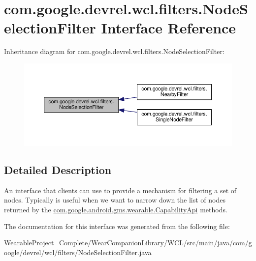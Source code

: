 \hypertarget{interfacecom_1_1google_1_1devrel_1_1wcl_1_1filters_1_1NodeSelectionFilter}{}\section{com.\+google.\+devrel.\+wcl.\+filters.\+Node\+Selection\+Filter Interface Reference}
\label{interfacecom_1_1google_1_1devrel_1_1wcl_1_1filters_1_1NodeSelectionFilter}


Inheritance diagram for com.\+google.\+devrel.\+wcl.\+filters.\+Node\+Selection\+Filter\+:\nopagebreak
\begin{figure}[H]
\begin{center}
\leavevmode
\includegraphics[width=350pt]{d3/dad/interfacecom_1_1google_1_1devrel_1_1wcl_1_1filters_1_1NodeSelectionFilter__inherit__graph}
\end{center}
\end{figure}


\subsection{Detailed Description}
An interface that clients can use to provide a mechanism for filtering a set of nodes. Typically is useful when we want to narrow down the list of nodes returned by the \hyperlink{}{com.\+google.\+android.\+gms.\+wearable.\+Capability\+Api} methods. 

The documentation for this interface was generated from the following file\+:\begin{DoxyCompactItemize}
\item 
Wearable\+Project\+\_\+\+Complete/\+Wear\+Companion\+Library/\+W\+C\+L/src/main/java/com/google/devrel/wcl/filters/Node\+Selection\+Filter.\+java\end{DoxyCompactItemize}

